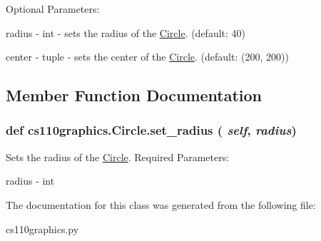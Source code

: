 Optional Parameters:
\begin{DoxyItemize}
\item radius -\/ int -\/ sets the radius of the \hyperlink{classcs110graphics_1_1Circle}{Circle}. (default: 40)
\item center -\/ tuple -\/ sets the center of the \hyperlink{classcs110graphics_1_1Circle}{Circle}. (default: (200, 200)) 
\end{DoxyItemize}

\subsection{Member Function Documentation}
\hypertarget{classcs110graphics_1_1Circle_a39b0cb138b31565d2a52180a2b03cc31}{
\subsubsection[{set\_\-radius}]{\setlength{\rightskip}{0pt plus 5cm}def cs110graphics.Circle.set\_\-radius ( {\em self}, \/   {\em radius})}}
\label{classcs110graphics_1_1Circle_a39b0cb138b31565d2a52180a2b03cc31}


Sets the radius of the \hyperlink{classcs110graphics_1_1Circle}{Circle}. Required Parameters:
\begin{DoxyItemize}
\item radius -\/ int 
\end{DoxyItemize}

The documentation for this class was generated from the following file:\begin{DoxyCompactItemize}
\item 
cs110graphics.py\end{DoxyCompactItemize}

